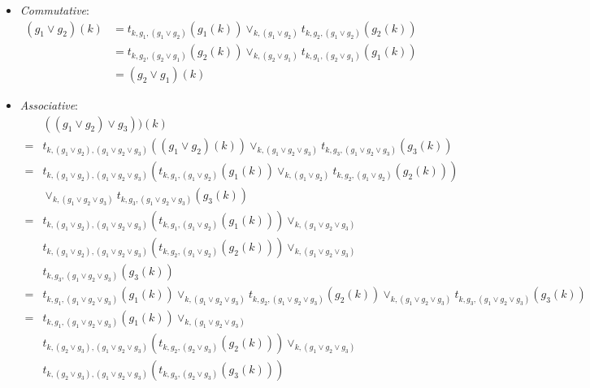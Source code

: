 \documentclass{article}
\begin{document}
        \begin{itemize}
          \item \emph{Commutative}:
            \begin{align*}
              (g_1 \vee g_2)(k) &= t_{k, g_1, (g_1 \vee g_2)}(g_1(k)) \vee_{k, (g_1 \vee g_2)} t_{k, g_2, (g_1 \vee g_2)}(g_2(k)) \\
              &= t_{k, g_2, (g_2 \vee g_1)}(g_2(k)) \vee_{k, (g_2 \vee g_1)} t_{k, g_1, (g_2 \vee g_1)}(g_1(k)) \\
              &= (g_2 \vee g_1)(k)
            \end{align*}
          \item \emph{Associative}:
            \begin{align*}
              &((g_1 \vee g_2) \vee g_3))(k) \\
              =& t_{k, (g_1 \vee g_2), (g_1 \vee g_2 \vee g_3)}((g_1 \vee g_2)(k)) \vee_{k, (g_1 \vee g_2 \vee g_3)} t_{k, g_3, (g_1 \vee g_2 \vee g_3)}(g_3(k)) \\
              =& t_{k, (g_1 \vee g_2), (g_1 \vee g_2 \vee g_3)}(t_{k, g_1, (g_1 \vee g_2)}(g_1(k)) \vee_{k, (g_1 \vee g_2)} t_{k, g_2, (g_1 \vee g_2)}(g_2(k))) \\
               & \vee_{k, (g_1 \vee g_2 \vee g_3)} t_{k, g_3, (g_1 \vee g_2 \vee g_3)}(g_3(k)) \\
              =& t_{k, (g_1 \vee g_2), (g_1 \vee g_2 \vee g_3)}(t_{k, g_1, (g_1 \vee g_2)}(g_1(k))) \vee_{k, (g_1 \vee g_2 \vee g_3)} \\
               & t_{k, (g_1 \vee g_2), (g_1 \vee g_2 \vee g_3)}(t_{k, g_2, (g_1 \vee g_2)}(g_2(k))) \vee_{k, (g_1 \vee g_2 \vee g_3)} \\
               & t_{k, g_3, (g_1 \vee g_2 \vee g_3)}(g_3(k)) \\
              =& t_{k, g_1, (g_1 \vee g_2 \vee g_3)}(g_1(k)) \vee_{k, (g_1 \vee g_2 \vee g_3)}
                 t_{k, g_2, (g_1 \vee g_2 \vee g_3)}(g_2(k)) \vee_{k, (g_1 \vee g_2 \vee g_3)}
                 t_{k, g_3, (g_1 \vee g_2 \vee g_3)}(g_3(k)) \\
              =& t_{k, g_1, (g_1 \vee g_2 \vee g_3)}(g_1(k)) \vee_{k, (g_1 \vee g_2 \vee g_3)} \\
               & t_{k, (g_2 \vee g_3), (g_1 \vee g_2 \vee g_3)}(t_{k, g_2, (g_2 \vee g_3)}(g_2(k))) \vee_{k, (g_1 \vee g_2 \vee g_3)} \\
               & t_{k, (g_2 \vee g_3), (g_1 \vee g_2 \vee g_3)}(t_{k, g_3, (g_2 \vee g_3)}(g_3(k))) \\

\end{align*}
\end{itemize}
\end{document}
